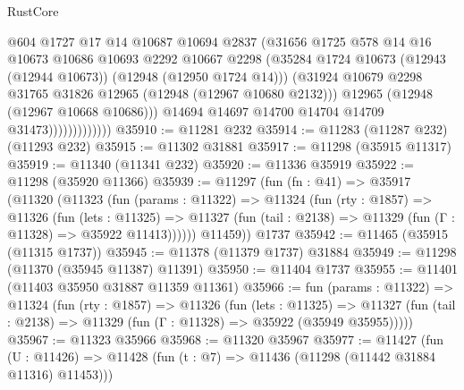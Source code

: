 \begin{lexlean}{RustCore}
\begin{coremodule}
                              @604
                              @1727
                              @17
                              @14
                              @10687
                              @10694
                              @2837
                              (@31656
                                @1725
                                @578
                                @14
                                @16
                                @10673
                                @10686
                                @10693
                                @2292
                                @10667
                                @2298
                                (@35284
                                  @1724
                                  @10673
                                  (@12943 (@12944 @10673))
                                  (@12948 (@12950 @1724 @14)))
                                (@31924
                                  @10679
                                  @2298
                                  @31765
                                  @31826
                                  @12965
                                  (@12948 (@12967 @10680 @2132)))
                                @12965
                                (@12948 (@12967 @10668 @10686)))
                              @14694
                              @14697
                              @14700
                              @14704
                              @14709
                              @31473)))))))))))))
@35910 := @11281 @232
@35914 := @11283 (@11287 @232) (@11293 @232)
@35915 := @11302 @31881
@35917 := @11298 (@35915 @11317)
@35919 := @11340 (@11341 @232)
@35920 := @11336 @35919
@35922 := @11298 (@35920 @11366)
@35939 := @11297
    (fun (fn : @41) =>
    @35917
      (@11320
        (@11323
          (fun (params : @11322) =>
          @11324
            (fun (rty : @1857) =>
            @11326
              (fun (lets : @11325) =>
              @11327 (fun (tail : @2138) => @11329 (fun (Γ : @11328) => @35922 @11413))))))
        @11459))
    @1737
@35942 := @11465 (@35915 (@11315 @1737))
@35945 := @11378 (@11379 @1737) @31884
@35949 := @11298 (@11370 (@35945 @11387) @11391)
@35950 := @11404 @1737
@35955 := @11401 (@11403 @35950 @31887 @11359 @11361)
@35966 := fun (params : @11322) =>
  @11324
    (fun (rty : @1857) =>
    @11326
      (fun (lets : @11325) =>
      @11327 (fun (tail : @2138) => @11329 (fun (Γ : @11328) => @35922 (@35949 @35955)))))
@35967 := @11323 @35966
@35968 := @11320 @35967
@35977 := @11427
    (fun (U : @11426) => @11428 (fun (t : @7) => @11436 (@11298 (@11442 @31884 @11316) @11453)))

\end{coremodule}
\end{lexlean}
